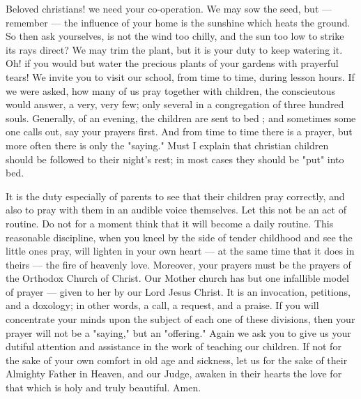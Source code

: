 Beloved christians! we need your co-operation.
We may sow the seed, but — remember — 
the influence of your home is the sunshine 
which heats the ground. So then ask yourselves,
is not the wind too chilly, and the sun 
too low to strike its rays direct? We may trim 
the plant, but it is your duty to keep watering it. 
Oh! if you would but water the precious plants 
of your gardens with prayerful tears! We 
invite you to visit our school, from time to time,
during lesson hours. If we were asked, how 
many of us pray together with children, the 
conscieutous would answer, a very, very few; 
only several in a congregation of three hundred 
souls. Generally, of an evening, the children 
are sent to bed ; and sometimes some one calls 
out, say your prayers first. And from time to 
time there is a prayer, but more often there is 
only the "saying." Must I explain that christian 
children should be followed to their night's 
rest; in most cases they should be "put" into 
bed. 

It is the duty especially of parents to see that 
their children pray correctly, and also to pray 
with them in an audible voice themselves. Let 
this not be an act of routine. Do not for a 
moment think that it will become a daily 
routine. This reasonable discipline, when 
you kneel by the side of tender childhood 
and see the little ones pray, will lighten 
in your own heart — at the same time 
that it does in theirs — the fire of heavenly love. 
Moreover, your prayers must be the prayers of 
the Orthodox Church of Christ. Our Mother 
church has but one infallible model of prayer — 
given to her by our Lord Jesus Christ. It is an 
invocation, petitions, and a doxology; in other
words, a call, a request, and a praise. If you 
will concentrate your minds upon the subject 
of each one of these divisions, then your prayer 
will not be a "saying," but an "offering." 
Again we ask you to give us your dutiful attention
and assistance in the work of teaching our 
children. If not for the sake of your own comfort
in old age and sickness, let us for the sake 
of their Almighty Father in Heaven, and our 
Judge, awaken in their hearts the love for that 
which is holy and truly beautiful. Amen.
